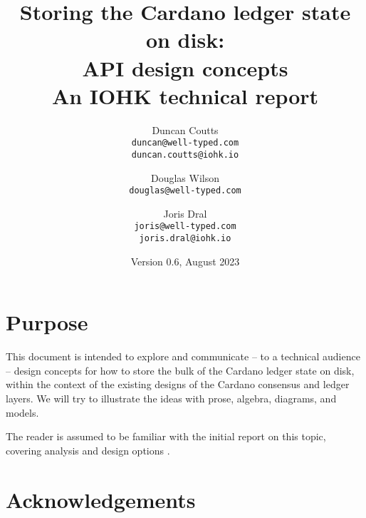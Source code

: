 \documentclass[11pt,a4paper]{article}
\begin{document}
\title{Storing the Cardano ledger state on disk: \\
       API design concepts \\
       {\large \sc An IOHK technical report}
  }
\date{Version 0.6, August 2023}
\author{Duncan Coutts      \\ {\small \texttt{duncan@well-typed.com}} \\
                              {\small \texttt{duncan.coutts@iohk.io}} \\
   \and Douglas Wilson     \\ {\small \texttt{douglas@well-typed.com}} \\
   \and Joris Dral         \\ {\small \texttt{joris@well-typed.com}} \\
                              {\small \texttt{joris.dral@iohk.io}} \\
   }

\maketitle

\begin{changelog}[simple, sectioncmd=\section*]
\end{changelog}

\section{Purpose}

This document is intended to explore and communicate -- to a technical audience
-- design concepts for how to store the bulk of the Cardano ledger state on
disk, within the context of the existing designs of the Cardano consensus and
ledger layers. We will try to illustrate the ideas with prose, algebra,
diagrams, and models.

The reader is assumed to be familiar with the initial report on this topic,
covering analysis and design options \citep{utxo-db}.

\section{Acknowledgements}
\end{document}
